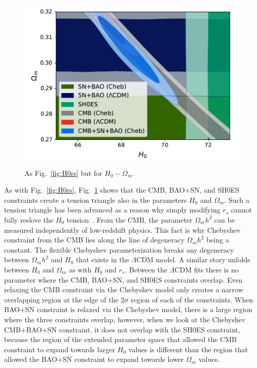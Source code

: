 \documentclass[
 reprint,
 amsmath,amssymb,
 aps,
]{revtex4-2}
\begin{document}
\begin{figure}
    \centering
    \includegraphics[width=\columnwidth]{H0Omegam.pdf}
    \caption{As Fig.~\ref{fig:H0rs} but for $H_0-\Omega_m$.}
    \label{fig:H0OmTri}
\end{figure}

As with Fig.~\ref{fig:H0rs}, Fig.~\ref{fig:H0OmTri} shows that the CMB, BAO+SN, and SH0ES constraints create a tension triangle also in the parameters $H_0$ and $\Omega_m$. Such a tension triangle has been advanced as a reason why simply modifying $r_s$ cannot fully reslove the $H_0$ tension~\cite{2021CmPhy...4..123J}.
From the CMB, the parameter $\Omega_m h^2$ can be measured independently of low-redshift physics.  This fact is why Chebyshev constraint from the CMB lies along the line of degeneracy $\Omega_m h^2$ being a constant. The flexible Chebyshev parameterization breaks any degeneracy between $\Omega_m h^2$ and $H_0$ that exists in the $\Lambda$CDM model.  
A similar story unfolds between $H_0$ and $\Omega_m$ as with $H_0$ and $r_s$.  Between the $\Lambda$CDM fits there is no parameter where the CMB, BAO+SN, and SH0ES constraints overlap. Even relaxing the CMB constraint via the Chebyshev model only creates a narrow overlapping region at the edge of the 2$\sigma$ region of each of the constraints. When BAO+SN constraint is relaxed via the Chebyshev model, there is a large region where the three constraints overlap, however, when we look at the Chebyshev CMB+BAO+SN constraint, it does not overlap with the SH0ES constraint, because the region of the extended parameter space that allowed the CMB constraint to expand towards larger $H_0$ values is different than the region that allowed the BAO+SN constraint to expand towards lower $\Omega_m$ values.
\end{document}
